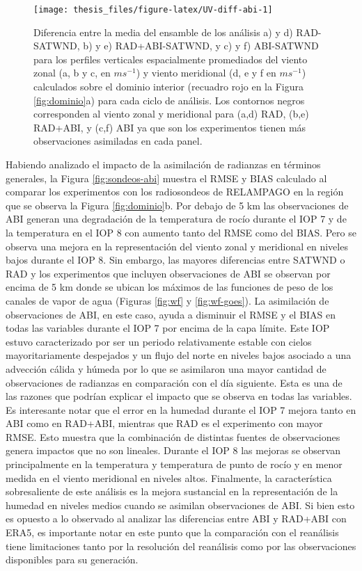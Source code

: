 \documentclass[12pt,oneside,a4paper]{reedthesis}
\begin{document}
\begin{figure}

\texttt{[image: thesis\_files/figure-latex/UV-diff-abi-1]} \hfill{}

\caption{Diferencia entre la media del ensamble de los análisis a) y d) RAD-SATWND, b) y e) RAD+ABI-SATWND, y c) y f) ABI-SATWND para los perfiles verticales espacialmente promediados del viento zonal (a, b y c, en \(ms^{-1}\)) y viento meridional (d, e y f en \(ms^{-1}\)) calculados sobre el dominio interior (recuadro rojo en la Figura \ref{fig:dominio}a) para cada ciclo de análisis. Los contornos negros corresponden al viento zonal y meridional para (a,d) RAD, (b,e) RAD+ABI, y (c,f) ABI ya que son los experimentos tienen más observaciones asimiladas en cada panel.}\label{fig:UV-diff-abi}
\end{figure}
Habiendo analizado el impacto de la asimilación de radianzas en términos generales, la Figura \ref{fig:sondeos-abi} muestra el RMSE y BIAS calculado al comparar los experimentos con los radiosondeos de RELAMPAGO en la región que se observa la Figura \ref{fig:dominio}b. Por debajo de 5 km las observaciones de ABI generan una degradación de la temperatura de rocío durante el IOP 7 y de la temperatura en el IOP 8 con aumento tanto del RMSE como del BIAS. Pero se observa una mejora en la representación del viento zonal y meridional en niveles bajos durante el IOP 8. Sin embargo, las mayores diferencias entre SATWND o RAD y los experimentos que incluyen observaciones de ABI se observan por encima de 5 km donde se ubican los máximos de las funciones de peso de los canales de vapor de agua (Figuras \ref{fig:wf} y \ref{fig:wf-goes}). La asimilación de observaciones de ABI, en este caso, ayuda a disminuir el RMSE y el BIAS en todas las variables durante el IOP 7 por encima de la capa límite. Este IOP estuvo caracterizado por ser un periodo relativamente estable con cielos mayoritariamente despejados y un flujo del norte en niveles bajos asociado a una advección cálida y húmeda por lo que se asimilaron una mayor cantidad de observaciones de radianzas en comparación con el día siguiente. Esta es una de las razones que podrían explicar el impacto que se observa en todas las variables. Es interesante notar que el error en la humedad durante el IOP 7 mejora tanto en ABI como en RAD+ABI, mientras que RAD es el experimento con mayor RMSE. Esto muestra que la combinación de distintas fuentes de observaciones genera impactos que no son lineales. Durante el IOP 8 las mejoras se observan principalmente en la temperatura y temperatura de punto de rocío y en menor medida en el viento meridional en niveles altos. Finalmente, la característica sobresaliente de este análisis es la mejora sustancial en la representación de la humedad en niveles medios cuando se asimilan observaciones de ABI. Si bien esto es opuesto a lo observado al analizar las diferencias entre ABI y RAD+ABI con ERA5, es importante notar en este punto que la comparación con el reanálisis tiene limitaciones tanto por la resolución del reanálisis como por las observaciones disponibles para su generación.
\end{document}
